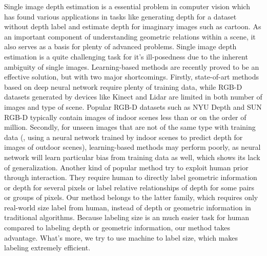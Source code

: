 \documentclass[10pt,twocolumn,letterpaper]{article}
\begin{document}
Single image depth estimation is a essential problem in computer vision which has found various applications in tasks like generating depth for a dataset without depth label and estimate depth for imaginary images such as cartoon. As an important component of understanding geometric relations within a scene, it also serves as a basis for plenty of advanced problems. Single image depth estimation is a quite challenging task for it's ill-posedness due to the inherent ambiguity of single images. Learning-based methods are recently proved to be an effective solution, but with two major shortcomings. Firstly, state-of-art methods based on deep neural network require plenty of training data, while RGB-D datasets generated by devices like Kinect and Lidar are limited in both number of images and type of scene. Popular RGB-D datasets such as NYU Depth \cite{silberman11indoor, Silberman:ECCV12} and SUN RGB-D \cite{SUN} typically contain images of indoor scenes less than or on the order of million. Secondly, for unseen images that are not of the same type with training data (\eg, using a neural network trained by indoor scenes to predict depth for images of outdoor scenes), learning-based methods may perform poorly, as neural network will learn particular bias from training data as well, which shows its lack of generalization. Another kind of popular method try to exploit human prior through interaction. They require human to directly label geometric information or depth for several pixels or label relative relationships of depth for some pairs or groups of pixels. Our method belongs to the latter family, which requires only real-world size label from human, instead of depth or geometric information in traditional algorithms. Because labeling size is an much easier task for human compared to labeling depth or geometric information, our method takes advantage. What's more, we try to use machine to label size, which makes labeling extremely efficient.



\end{document}
